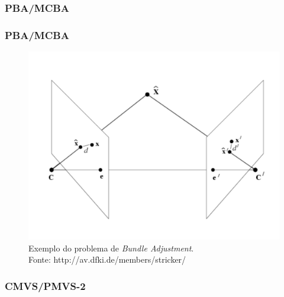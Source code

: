 \documentclass[table, usenames, svgnames, xcolor=dvipsnames]{beamer}
\begin{document}
\subsubsection{PBA/MCBA}
\begin{frame} 
\frametitle{\textbf{PBA/MCBA}}
	\begin{center}
		\begin{figure}
			\includegraphics[width=0.6\linewidth]{figs/bundleAdjustment.png}
			\caption{Exemplo do problema de \protect\emph{Bundle Adjustment}. \\
			\tiny{Fonte: http://av.dfki.de/members/stricker/}
			}
		\end{figure}
	\end{center}
\end{frame}




\subsubsection{CMVS/PMVS-2}
\end{document}
